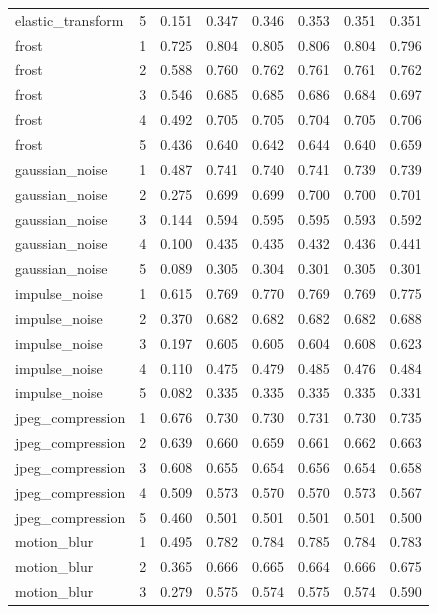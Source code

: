 {\begin{longtable}{lrrrrrrr}
elastic\_transform & 5 & 0.151 & 0.347 & 0.346 & 0.353 & 0.351 & 0.351 \\
frost & 1 & 0.725 & 0.804 & 0.805 & 0.806 & 0.804 & 0.796 \\
frost & 2 & 0.588 & 0.760 & 0.762 & 0.761 & 0.761 & 0.762 \\
frost & 3 & 0.546 & 0.685 & 0.685 & 0.686 & 0.684 & 0.697 \\
frost & 4 & 0.492 & 0.705 & 0.705 & 0.704 & 0.705 & 0.706 \\
frost & 5 & 0.436 & 0.640 & 0.642 & 0.644 & 0.640 & 0.659 \\
gaussian\_noise & 1 & 0.487 & 0.741 & 0.740 & 0.741 & 0.739 & 0.739 \\
gaussian\_noise & 2 & 0.275 & 0.699 & 0.699 & 0.700 & 0.700 & 0.701 \\
gaussian\_noise & 3 & 0.144 & 0.594 & 0.595 & 0.595 & 0.593 & 0.592 \\
gaussian\_noise & 4 & 0.100 & 0.435 & 0.435 & 0.432 & 0.436 & 0.441 \\
gaussian\_noise & 5 & 0.089 & 0.305 & 0.304 & 0.301 & 0.305 & 0.301 \\
impulse\_noise & 1 & 0.615 & 0.769 & 0.770 & 0.769 & 0.769 & 0.775 \\
impulse\_noise & 2 & 0.370 & 0.682 & 0.682 & 0.682 & 0.682 & 0.688 \\
impulse\_noise & 3 & 0.197 & 0.605 & 0.605 & 0.604 & 0.608 & 0.623 \\
impulse\_noise & 4 & 0.110 & 0.475 & 0.479 & 0.485 & 0.476 & 0.484 \\
impulse\_noise & 5 & 0.082 & 0.335 & 0.335 & 0.335 & 0.335 & 0.331 \\
jpeg\_compression & 1 & 0.676 & 0.730 & 0.730 & 0.731 & 0.730 & 0.735 \\
jpeg\_compression & 2 & 0.639 & 0.660 & 0.659 & 0.661 & 0.662 & 0.663 \\
jpeg\_compression & 3 & 0.608 & 0.655 & 0.654 & 0.656 & 0.654 & 0.658 \\
jpeg\_compression & 4 & 0.509 & 0.573 & 0.570 & 0.570 & 0.573 & 0.567 \\
jpeg\_compression & 5 & 0.460 & 0.501 & 0.501 & 0.501 & 0.501 & 0.500 \\
motion\_blur & 1 & 0.495 & 0.782 & 0.784 & 0.785 & 0.784 & 0.783 \\
motion\_blur & 2 & 0.365 & 0.666 & 0.665 & 0.664 & 0.666 & 0.675 \\
motion\_blur & 3 & 0.279 & 0.575 & 0.574 & 0.575 & 0.574 & 0.590 \\

\end{longtable}}
